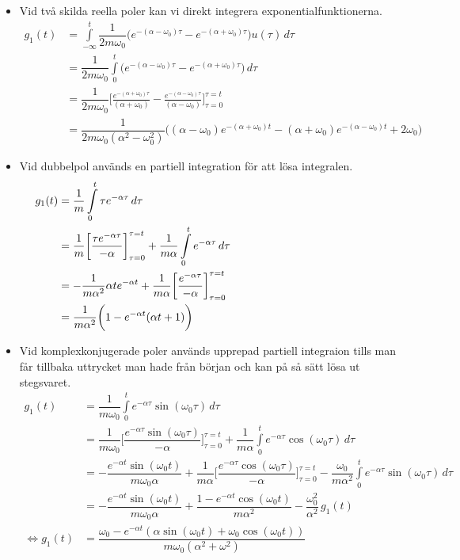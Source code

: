 \begin{itemize}
    \item Vid två skilda reella poler kan vi direkt integrera exponentialfunktionerna.
    $$\begin{aligned}
    g_1(t)
    &=\int\limits_{-\infty}^{t}\dfrac{1}{2m\omega_0}\bigg(e^{-(\alpha-\omega_0)\tau}-e^{-(\alpha+\omega_0)\tau}\bigg)u(\tau)\,d\tau
    \\&=\dfrac{1}{2m\omega_0}\int\limits_{0}^{t}\bigg(e^{-(\alpha-\omega_0)\tau}-e^{-(\alpha+\omega_0)\tau}\bigg)\,d\tau
    \\&=\dfrac{1}{2m\omega_0}\bigg[\frac{e^{-(\alpha+\omega_0)\tau}}{(\alpha+\omega_0)}-\frac{e^{-(\alpha-\omega_0)\tau}}{(\alpha-\omega_0)} \bigg]_{\tau=0}^{\tau=t}
    \\&=\dfrac{1}{2m\omega_0(\alpha^2-\omega_0^2)}\bigg((\alpha-\omega_0)e^{-(\alpha+\omega_0)t}-(\alpha+\omega_0)e^{-(\alpha-\omega_0)t}+2\omega_0\bigg)\end{aligned}$$
    \item Vid dubbelpol används en partiell integration för att lösa integralen.
    $$\begin{aligned}g_1(t)&=\dfrac{1}{m}\int\limits_{0}^{t}\tau e^{-\alpha \tau}\,d\tau
    \\&=\dfrac{1}{m} \bigg[\dfrac{\tau e^{-\alpha \tau}}{-\alpha}\bigg]_{\tau=0}^{\tau=t}+\dfrac{1}{m\alpha}\int\limits_{0}^{t}e^{-\alpha \tau}\,d\tau
    \\&=-\dfrac{1}{m\alpha^2}\alpha te^{-\alpha t}+\dfrac{1}{m\alpha}\bigg[\dfrac{e^{-\alpha \tau}}{-\alpha}\bigg]_{\tau=0}^{\tau=t}
    \\&=\dfrac{1}{m\alpha^2}\bigg(1-e^{-\alpha t}(\alpha t+1)\bigg)\text{\hspace{6cm}\,}\end{aligned}$$
    \newpage
    \item Vid komplexkonjugerade poler används upprepad partiell integraion tills man får tillbaka uttrycket man hade från början och kan på så sätt lösa ut stegsvaret.
    $$\begin{aligned}
    g_1(t)&=\dfrac{1}{m\omega_0}\int\limits_{0}^{t} e^{-\alpha \tau} \sin(\omega_0 \tau)\,d\tau
    \\&=\dfrac{1}{m\omega_0}\bigg[\dfrac{e^{-\alpha \tau}\sin(\omega_0 \tau)}{-\alpha}\bigg]_{\tau=0}^{\tau=t}+\dfrac{1}{m\alpha}\int\limits_{0}^{t} e^{-\alpha \tau} \cos(\omega_0\tau)\,d\tau
    \\&=-\dfrac{e^{-\alpha t}\sin(\omega_0 t)}{m\omega_0\alpha}+\dfrac{1}{m\alpha}\bigg[\dfrac{e^{-\alpha \tau}\cos(\omega_0 \tau)}{-\alpha}\bigg]_{\tau=0}^{\tau=t}-\dfrac{\omega_0}{m\alpha^2}\int\limits_{0}^{t}e^{-\alpha \tau} \sin(\omega_0 \tau)\,d\tau
    \\&=-\dfrac{e^{-\alpha t}\sin(\omega_0 t)}{m\omega_0\alpha}+\dfrac{1-e^{-\alpha t}\cos(\omega_0 t)}{m\alpha^2}-\dfrac{\omega_0^2}{\alpha^2}\,g_1(t)
    \\\Longleftrightarrow g_1(t)
    &=\dfrac{\omega_0-e^{-\alpha t}(\alpha\sin(\omega_0 t)+\omega_0\cos(\omega_0 t))}{m\omega_0(\alpha^2+\omega^2)}\end{aligned}$$
\end{itemize}
